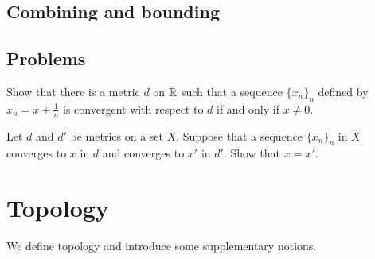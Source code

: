 \documentclass{../crs}
\begin{document}
\subsection{Combining and bounding}




















\subsection*{Problems}
\begin{prb}
Show that there is a metric $d$ on $\mathbb{R}$ such that a sequence $\{x_n\}_n$ defined by $x_n=x+\frac1n$ is convergent with respect to $d$ if and only if $x\ne0$.
\end{prb}
\begin{prb}
Let $d$ and $d'$ be metrics on a set $X$.
Suppose that a sequence $\{x_n\}_n$ in $X$ converges to $x$ in $d$ and converges to $x'$ in $d'$.
Show that $x=x'$.
\end{prb}
\begin{prb}

\end{prb}











\section{Topology}
We define topology and introduce some supplementary notions.




\end{document}

